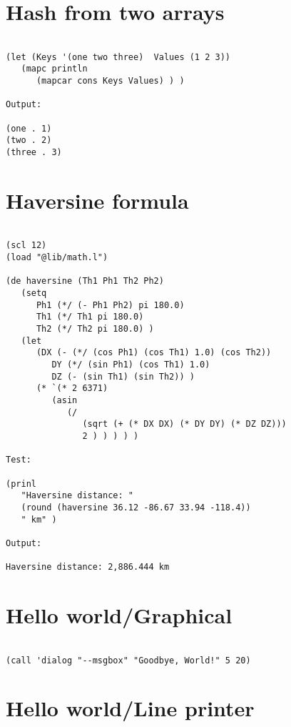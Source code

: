 \section*{Hash from two arrays}

\begin{verbatim}

(let (Keys '(one two three)  Values (1 2 3))
   (mapc println
      (mapcar cons Keys Values) ) )

Output:

(one . 1)
(two . 2)
(three . 3)

\end{verbatim}

\section*{Haversine formula}

\begin{verbatim}

(scl 12)
(load "@lib/math.l")

(de haversine (Th1 Ph1 Th2 Ph2)
   (setq
      Ph1 (*/ (- Ph1 Ph2) pi 180.0)
      Th1 (*/ Th1 pi 180.0)
      Th2 (*/ Th2 pi 180.0) )
   (let
      (DX (- (*/ (cos Ph1) (cos Th1) 1.0) (cos Th2))
         DY (*/ (sin Ph1) (cos Th1) 1.0)
         DZ (- (sin Th1) (sin Th2)) )
      (* `(* 2 6371)
         (asin
            (/
               (sqrt (+ (* DX DX) (* DY DY) (* DZ DZ)))
               2 ) ) ) ) )

Test:

(prinl
   "Haversine distance: "
   (round (haversine 36.12 -86.67 33.94 -118.4))
   " km" )

Output:

Haversine distance: 2,886.444 km

\end{verbatim}

\section*{Hello world/Graphical}

\begin{verbatim}

(call 'dialog "--msgbox" "Goodbye, World!" 5 20)

\end{verbatim}

\section*{Hello world/Line printer}

